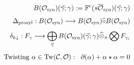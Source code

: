 \documentclass[preview]{standalone}
\begin{document}
\begin{align*}
\special{dvisvgm:raw <g id='unique000'>}B(\mathcal{O}_{\text{syn}})(\vec{\gamma};\gamma) := \mathbb{F}^c(s\overline{\mathcal{O}}_{\text{syn}})(\vec{\gamma};\gamma)\\[4pt]\Delta_{\text{prosyl}}: B(\mathcal{O}_{\text{syn}}) \longrightarrow B(\mathcal{O}_{\text{syn}}) \widehat{\circ} B(\mathcal{O}_{\text{syn}})\\[4pt]\delta_{k\downarrow}: F_\gamma \longrightarrow \bigoplus_{\vec{\gamma}} B(\mathcal{O}_{\text{syn}})(\vec{\gamma};\gamma) \widehat{\otimes}_\pi \bigotimes F_{\gamma_i}\\[4pt]\text{Twisting }\alpha\in\operatorname{Tw}(\mathcal{C},\mathcal{O}):\;\; \partial(\alpha) + \alpha \star \alpha = 0\special{dvisvgm:raw </g>}
\end{align*}
\end{document}
